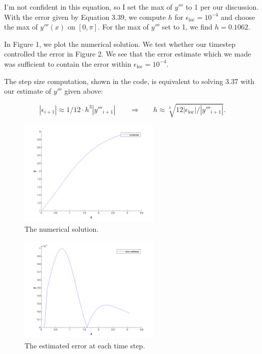 \documentclass[11pt]{article}
\begin{document}
\begin{enumerate}
I'm not confident in this equation, so I set the max of $y'''$ to 1 per our discussion.
With the error given by Equation 3.39, we compute $h$ for $\epsilon _\text{loc} = 10^{-4}$ and choose the max of $y'''(x)$ on $[0,\pi]$.
For the max of $y'''$ set to 1, we find $h = 0.1062$.


In Figure 1, we plot the numerical solution.
We test whether our timestep controlled the error in Figure 2.
We see that the error estimate which we made was sufficient to contain the error within $\epsilon _\text{loc} = 10 ^{-4}$.

The step size computation, shown in the code, is equivalent to solving 3.37 with our estimate of $y'''$ given above:

\[ |\epsilon_{i+1} | \approx 1/12 \cdot h^3 | y''' _{i+1}| ~~~~~~~~~\Rightarrow~~~~~~~~ h \approx \sqrt[3]{12 |\epsilon_{\text{loc}}| / | y''' _{i+1}|} .\]



\begin{figure}
  \centering
    \includegraphics[width=0.6\textwidth]{andy_hw03_prb4_numerical.png}
  \caption{The numerical solution.}
\end{figure}

\begin{figure}
  \centering
    \includegraphics[width=0.6\textwidth]{andy_hw03_prb4_just_error.png}
  \caption{The estimated error at each time step.}
\end{figure}

\end{enumerate}
\end{document}
